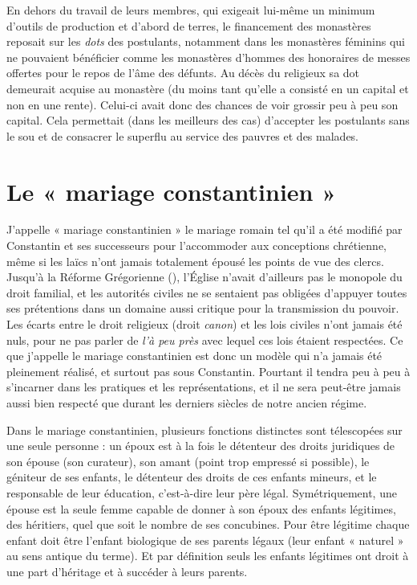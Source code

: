  En dehors du travail de leurs membres, qui exigeait lui-même un minimum d'outils de production et d'abord de terres, le financement des monastères reposait sur les \emph{dots} des postulants, notamment dans les monastères féminins qui ne pouvaient bénéficier comme les monastères d'hommes des honoraires de messes offertes pour le repos de l'âme des défunts. Au décès du religieux sa dot demeurait acquise au monastère (du moins tant qu'elle a consisté en un capital et non en une rente). Celui-ci avait donc des chances de voir grossir peu à peu son capital. Cela permettait (dans les meilleurs des cas) d'accepter les postulants sans le sou et de consacrer le superflu au service des pauvres et des malades.
 

\section{Le « mariage constantinien »}


 J'appelle « mariage constantinien » le mariage romain tel qu'il a été modifié par Constantin et ses successeurs pour l'accommoder aux conceptions chrétienne, même si les laïcs n'ont jamais totalement épousé les points de vue des clercs. Jusqu'à la Réforme Grégorienne (), l'Église n'avait d'ailleurs pas le monopole du droit familial, et les autorités civiles ne se sentaient pas obligées d'appuyer toutes ses prétentions dans un domaine aussi critique pour la transmission du pouvoir. Les écarts entre le droit religieux (droit \emph{canon}) et les lois civiles n'ont jamais été nuls, pour ne pas parler de \emph{l'à peu près} avec lequel ces lois étaient respectées. Ce que j'appelle le mariage constantinien est donc un modèle qui n'a jamais été pleinement réalisé, et surtout pas sous Constantin. Pourtant il tendra peu à peu à s'incarner dans les pratiques et les représentations, et il ne sera peut-être jamais aussi bien respecté que durant les derniers siècles de notre ancien régime.

 Dans le mariage constantinien, plusieurs fonctions distinctes sont télescopées sur une seule personne : un époux est à la fois le détenteur des droits juridiques de son épouse (son curateur), son amant (point trop empressé si possible), le géniteur de ses enfants, le détenteur des droits de ces enfants mineurs, et le responsable de leur éducation, c'est-à-dire leur père légal. Symétriquement, une épouse est la seule femme capable de donner à son époux des enfants légitimes, des héritiers, quel que soit le nombre de ses concubines. Pour être légitime chaque enfant doit être l'enfant biologique de ses parents légaux (leur enfant « naturel » au sens antique du terme). Et par définition seuls les enfants légitimes ont droit à une part d'héritage et à succéder à leurs parents.

